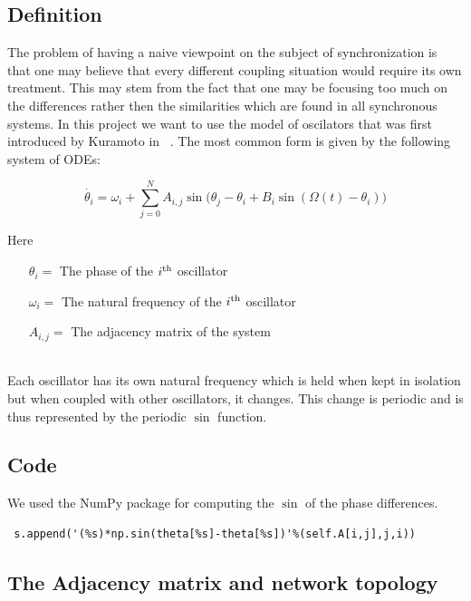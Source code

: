 \label{sec:kuramoto}

\subsection{Definition}
The problem of having a naive viewpoint on the subject of synchronization is that one may believe that every different coupling situation would require its own treatment. This may stem from the fact that one may be focusing too much on the differences rather then the similarities which are found in all synchronous systems.  In this project we want to use the model of oscilators that was first introduced by Kuramoto in ~\cite{book:kura}. The most common form is given by the following system of ODEs:

\[
\dot{\theta_i} = \omega_i + \sum_{j = 0}^{N}{A_{i, j}\sin({\theta_j - \theta_i}} + B_i \sin(\Omega(t) - \theta_i)
)\]

Here 
\begin{itemize}
	\item[${\theta_i} = $] The phase of the $i\textsuperscript{th}$ oscillator
	\item[$\omega_i = $] The natural frequency of the $i\textsuperscript{th}$ oscillator
	\item[$A_{i, j} = $] The adjacency matrix of the system
\end{itemize}
~\\
Each oscillator has its own natural frequency which is held when kept in isolation but when coupled with other oscillators, it changes. This change is periodic and is thus represented by the periodic $\sin$ function. 

\subsection{Code}
We used the NumPy package for computing the $\sin$ of the phase differences.
\\
\begin{lstlisting}
 s.append('(%s)*np.sin(theta[%s]-theta[%s])'%(self.A[i,j],j,i))
\end{lstlisting}


\subsection{The Adjacency matrix and network topology}


